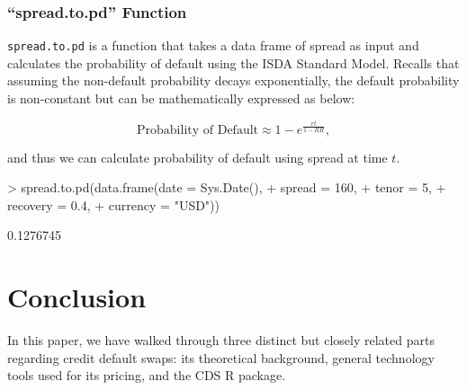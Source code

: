 \documentclass{jss}
\begin{document}
\subsubsection{``spread.to.pd'' Function}

\texttt{spread.to.pd} is a function that takes a data frame of spread as input and calculates the probability of default using the ISDA Standard Model. Recalls that assuming the non-default probability decays exponentially, the default probability is non-constant but can be mathematically expressed as below:
 
\begin{equation}
  \text{Probability of Default} \approx 1 - e ^ {\frac{rt}{1-RR}}, \nonumber
\end{equation}

and thus we can calculate probability of default using spread at time $t$.

\begin{Schunk}
\begin{Sinput}
> spread.to.pd(data.frame(date     = Sys.Date(),
+                         spread   = 160,
+                         tenor    = 5,
+                         recovery = 0.4,
+                         currency = "USD"))
\end{Sinput}
\begin{Soutput}
[1] 0.1276745
\end{Soutput}
\end{Schunk}

\section{Conclusion}


In this paper, we have walked through three distinct but closely related parts regarding credit default swaps: its theoretical background, general technology tools used for its pricing, and the CDS R package.

\end{document}
